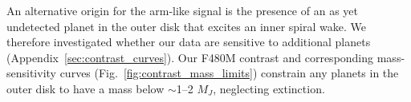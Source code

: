 \documentclass[longauth]{aa}
\begin{document}
An alternative origin for the arm-like signal is the presence of an as yet undetected planet in the outer disk that excites an inner spiral wake. We therefore investigated whether our data are sensitive to additional planets (Appendix~\ref{sec:contrast_curves}).
Our F480M contrast %
and corresponding mass-sensitivity curves (Fig.~\ref{fig:contrast_mass_limits}) %
constrain any %
planets in the outer disk to have a mass below $\sim$1--2 $M_J$, neglecting extinction.
\end{document}
